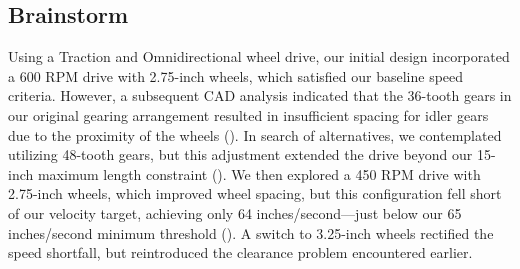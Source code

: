 \subsection*{Brainstorm}
Using a Traction and Omnidirectional wheel drive, our initial design incorporated a 600 RPM drive with 2.75-inch wheels, which satisfied our baseline speed criteria. However, a subsequent CAD analysis indicated that the 36-tooth gears in our original gearing arrangement resulted in insufficient spacing for idler gears due to the proximity of the wheels (). In search of alternatives, we contemplated utilizing 48-tooth gears, but this adjustment extended the drive beyond our 15-inch maximum length constraint (). We then explored a 450 RPM drive with 2.75-inch wheels, which improved wheel spacing, but this configuration fell short of our velocity target, achieving only 64 inches/second—just below our 65 inches/second minimum threshold (). A switch to 3.25-inch wheels rectified the speed shortfall, but reintroduced the clearance problem encountered earlier.


